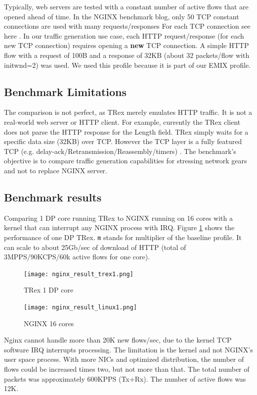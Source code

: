 \documentclass[letterpaper]{article}
\begin{document}
Typically, web servers are tested with a constant number of active flows that are opened ahead of time. 
In the NGINX benchmark blog, only 50 TCP constant connections are used with many requests/responses 
For each TCP connection see here \cite{b6}. In our traffic generation use case, each HTTP request/response (for each new TCP connection) requires opening a \textbf{new} TCP connection. 
A simple HTTP flow with a request of 100B and a response of 32KB (about 32 packets/flow with initwnd=2) was used.
We used this profile because it is part of our EMIX profile. 

\subsection{Benchmark Limitations}

The comparison is not perfect, as TRex merely emulates HTTP traffic. 
It is not a real-world web server or HTTP client. For example, currently the TRex client does not parse the HTTP response for the Length field. 
TRex simply waits for a specific data size (32KB) over TCP. However the TCP layer is a fully featured TCP (e.g. delay-ack/Retransmission/Reassembly/timers) . 
The benchmark's objective is to compare traffic generation capabilities for stressing network gears and not to replace NGINX server. 

\subsection{Benchmark results}

Comparing 1 DP core running TRex to NGINX running on 16 cores with a kernel that can interrupt any NGINX process with IRQ. Figure \ref{fig:trex_nginx_r1} shows the performance of one DP TRex. \texttt{m} stands for multiplier of the baseline profile. 
It can scale to about 25Gb/sec of download of HTTP (total of 3MPPS/90KCPS/60k active flows for one core).

\begin{figure}[h]
\texttt{[image: nginx\_result\_trex1.png]}
\caption{TRex 1 DP core}
\label{fig:trex_nginx_r1}
\end{figure}

\begin{figure}[h]
\texttt{[image: nginx\_result\_linux1.png]}
\caption{NGINX 16 cores}
\label{fig:trex_nginx_r2}
\end{figure}

Nginx cannot handle more than 20K new flows/sec, due to the kernel TCP software IRQ interrupts processing. 
The limitation is the kernel and not NGINX's user space process.
With more NICs and optimized distribution, the number of flows could be increased times two, but not more than that. 
The total number of packets was approximately 600KPPS (Tx+Rx). The number of active flows was 12K.
\end{document}
